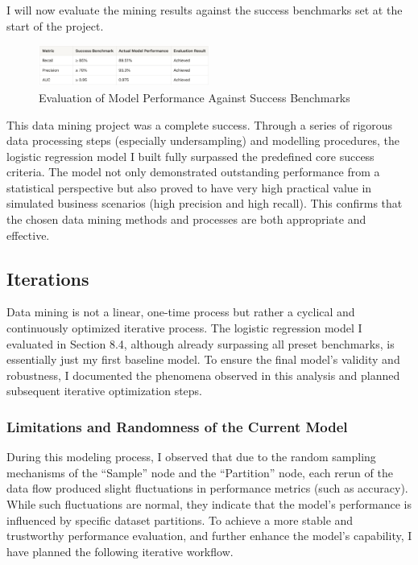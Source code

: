 \documentclass[sigplan,screen]{acmart}
\begin{document}
I will now evaluate the mining results against the success benchmarks set at the start of the project.

\begin{figure}[H]
    \centering
    \includegraphics[width=0.5\textwidth]{table5.jpg}
    \caption*{Evaluation of Model Performance Against Success Benchmarks}
    \label{fig:table5}
\end{figure}

This data mining project was a complete success. Through a series of rigorous data processing steps (especially undersampling) and modelling procedures, the logistic regression model I built fully surpassed the predefined core success criteria. The model not only demonstrated outstanding performance from a statistical perspective but also proved to have very high practical value in simulated business scenarios (high precision and high recall). This confirms that the chosen data mining methods and processes are both appropriate and effective.

\subsection{Iterations}

Data mining is not a linear, one-time process but rather a cyclical and continuously optimized iterative process. The logistic regression model I evaluated in Section 8.4, although already surpassing all preset benchmarks, is essentially just my first baseline model. To ensure the final model's validity and robustness, I documented the phenomena observed in this analysis and planned subsequent iterative optimization steps.

\subsubsection{Limitations and Randomness of the Current Model}

During this modeling process, I observed that due to the random sampling mechanisms of the ``Sample'' node and the ``Partition'' node, each rerun of the data flow produced slight fluctuations in performance metrics (such as accuracy). While such fluctuations are normal, they indicate that the model's performance is influenced by specific dataset partitions. To achieve a more stable and trustworthy performance evaluation, and further enhance the model's capability, I have planned the following iterative workflow.
\end{document}
